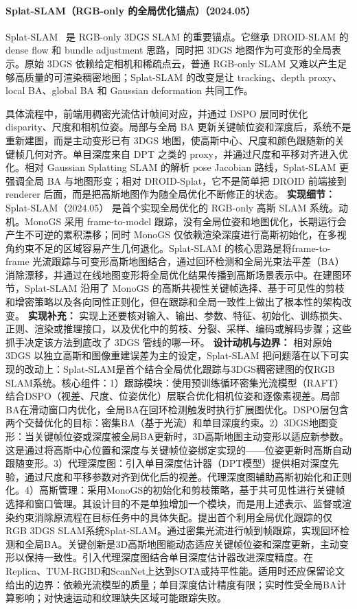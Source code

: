 \paragraph{Splat-SLAM（RGB-only 的全局优化锚点）（2024.05）}
Splat-SLAM~\cite{2405_16544} 是 RGB-only 3DGS SLAM 的重要锚点。它继承 DROID-SLAM 的 dense flow 和 bundle adjustment 思路，同时把 3DGS 地图作为可变形的全局表示。原始 3DGS 依赖给定相机和稀疏点云，普通 RGB-only SLAM 又难以产生足够高质量的可渲染稠密地图；Splat-SLAM 的改变是让 tracking、depth proxy、local BA、global BA 和 Gaussian deformation 共同工作。

具体流程中，前端用稠密光流估计帧间对应，并通过 DSPO 层同时优化 disparity、尺度和相机位姿。局部与全局 BA 更新关键帧位姿和深度后，系统不是重新建图，而是主动变形已有 3DGS 地图，使高斯中心、尺度和颜色跟随新的关键帧几何对齐。单目深度来自 DPT 之类的 proxy，并通过尺度和平移对齐进入优化。相对 Gaussian Splatting SLAM 的解析 pose Jacobian 路线，Splat-SLAM 更强调全局 BA 与地图形变；相对 DROID-Splat，它不是简单把 DROID 前端接到 renderer 后面，而是把高斯地图作为随全局优化不断修正的状态。
\textbf{实现细节：} Splat-SLAM（2024.05） 是首个实现全局优化的 RGB-only 高斯 SLAM 系统。动机。MonoGS 采用 frame-to-model 跟踪，没有全局位姿和地图优化，长期运行会产生不可逆的累积漂移；同时 MonoGS 仅依赖渲染深度进行高斯初始化，在多视角约束不足的区域容易产生几何退化。Splat-SLAM 的核心思路是将frame-to-frame 光流跟踪与可变形高斯地图结合，通过回环检测和全局光束法平差（BA）消除漂移，并通过在线地图变形将全局优化结果传播到高斯场景表示中。在建图环节，Splat-SLAM 沿用了 MonoGS 的高斯共视性关键帧选择、基于可见性的剪枝和增密策略以及各向同性正则化，但在跟踪和全局一致性上做出了根本性的架构改变。
\textbf{实现补充：} 实现上还要核对输入、输出、参数、特征、初始化、训练损失、正则、渲染或推理接口，以及优化中的剪枝、分裂、采样、编码或解码步骤；这些抓手决定该方法到底改了 3DGS 管线的哪一环。
\textbf{设计动机与边界：} 相对原始 3DGS 以独立高斯和图像重建误差为主的设定，Splat-SLAM 把问题落在以下可实现的改动上：Splat-SLAM是首个结合全局优化跟踪与3DGS稠密建图的仅RGB SLAM系统。核心组件：1）跟踪模块：使用预训练循环密集光流模型（RAFT）结合DSPO（视差、尺度、位姿优化）层联合优化相机位姿和逐像素视差。局部BA在滑动窗口内优化，全局BA在回环检测触发时执行扩展图优化。DSPO层包含两个交替优化的目标：密集BA（基于光流）和单目深度约束。2）3DGS地图变形：当关键帧位姿或深度被全局BA更新时，3D高斯地图主动变形以适应新参数。这是通过将高斯中心位置和深度与关键帧位姿绑定实现的——位姿更新时高斯自动跟随变形。3）代理深度图：引入单目深度估计器（DPT模型）提供相对深度先验，通过尺度和平移参数对齐到优化后的视差。代理深度图辅助高斯初始化和正则化。4）高斯管理：采用MonoGS的初始化和剪枝策略，基于共可见性进行关键帧选择和窗口管理。其设计目的不是单独增加一个模块，而是用上述表示、监督或渲染约束消除原流程在目标任务中的具体失配。提出首个利用全局优化跟踪的仅RGB 3DGS SLAM系统Splat-SLAM。通过密集光流进行帧到帧跟踪，实现回环检测和全局BA。关键创新是3D高斯地图能动态适应关键帧位姿和深度更新，主动变形以保持一致性。引入代理深度图结合单目深度估计器改进深度精度。在Replica、TUM-RGBD和ScanNet上达到SOTA或持平性能。适用时还应保留论文给出的边界：依赖光流模型的质量；单目深度估计精度有限；实时性受全局BA计算影响；对快速运动和纹理缺失区域可能跟踪失败。
